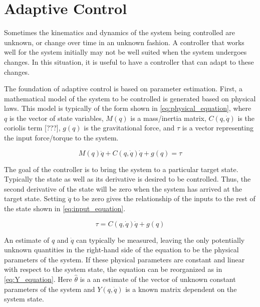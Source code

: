 \documentclass[letterpaper,12pt,titlepage,oneside,final]{book}
\begin{document}
\section{Adaptive Control} \label{sec:adaptive_control}


Sometimes the kinematics and dynamics of the system being controlled are unknown, or change over time in an unknown fashion. 
A controller that works well for the system initially may not be well suited when the system undergoes changes. 
In this situation, it is useful to have a controller that can adapt to these changes.

The foundation of adaptive control is based on parameter estimation. 
First, a mathematical model of the system to be controlled is generated based on physical laws. 
This model is typically of the form shown in \eqref{eq:physical_equation}, where $q$ is the vector of state variables, $M(q)$ is a mass/inertia matrix, $C(q,\dot{q})$ is the coriolis term [???], $g(q)$ is the gravitational force, and $\tau$ is a vector representing the input force/torque to the system.

\begin{equation} \label{eq:physical_equation}
M(q)\ddot{q} + C(q,\dot{q})\dot{q} + g(q) = \tau
\end{equation}

The goal of the controller is to bring the system to a particular target state.
Typically the state as well as its derivative is desired to be controlled.
Thus, the second derivative of the state will be zero when the system has arrived at the target state.
Setting $\ddot{q}$ to be zero gives the relationship of the inputs to the rest of the state shown in \eqref{eq:input_equation}.

\begin{equation} \label{eq:input_equation}
\tau = C(q,\dot{q})\dot{q} + g(q)
\end{equation}

An estimate of $q$ and $\dot{q}$ can typically be measured, leaving the only potentially unknown quantities in the right-hand side of the equation to be the physical parameters of the system.
If these physical parameters are constant and linear with respect to the system state, the equation can be reorganized as in \eqref{eq:Y_equation}.
Here $\hat{\theta}$ is a an estimate of the vector of unknown constant parameters of the system and $Y(q,\dot{q})$ is a known matrix dependent on the system state.
\end{document}
